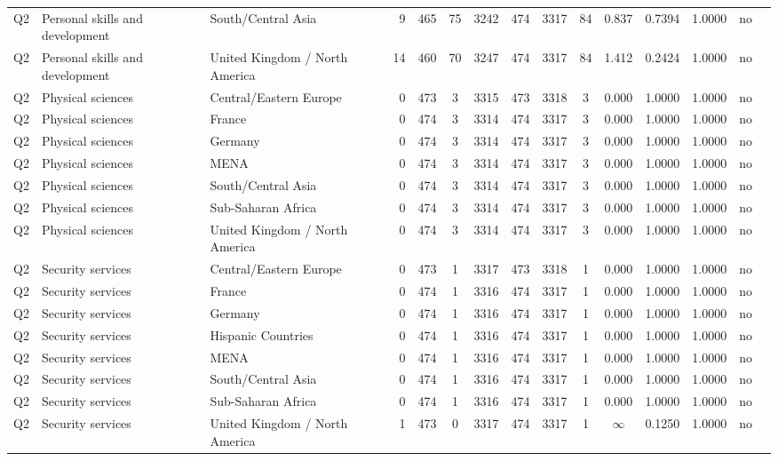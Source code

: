 \begin{longtable}{lllrcccccccccll}
Q2 & Personal skills and development & South/Central Asia & 9 & 465 & 75 & 3242 & 474 & 3317 & 84 & 0.837 & 0.7394 & 1.0000 & no \\
Q2 & Personal skills and development & United Kingdom / North America & 14 & 460 & 70 & 3247 & 474 & 3317 & 84 & 1.412 & 0.2424 & 1.0000 & no \\
Q2 & Physical sciences & Central/Eastern Europe & 0 & 473 & 3 & 3315 & 473 & 3318 & 3 & 0.000 & 1.0000 & 1.0000 & no \\
Q2 & Physical sciences & France & 0 & 474 & 3 & 3314 & 474 & 3317 & 3 & 0.000 & 1.0000 & 1.0000 & no \\
Q2 & Physical sciences & Germany & 0 & 474 & 3 & 3314 & 474 & 3317 & 3 & 0.000 & 1.0000 & 1.0000 & no \\
Q2 & Physical sciences & MENA & 0 & 474 & 3 & 3314 & 474 & 3317 & 3 & 0.000 & 1.0000 & 1.0000 & no \\
Q2 & Physical sciences & South/Central Asia & 0 & 474 & 3 & 3314 & 474 & 3317 & 3 & 0.000 & 1.0000 & 1.0000 & no \\
Q2 & Physical sciences & Sub-Saharan Africa & 0 & 474 & 3 & 3314 & 474 & 3317 & 3 & 0.000 & 1.0000 & 1.0000 & no \\
Q2 & Physical sciences & United Kingdom / North America & 0 & 474 & 3 & 3314 & 474 & 3317 & 3 & 0.000 & 1.0000 & 1.0000 & no \\
Q2 & Security services & Central/Eastern Europe & 0 & 473 & 1 & 3317 & 473 & 3318 & 1 & 0.000 & 1.0000 & 1.0000 & no \\
Q2 & Security services & France & 0 & 474 & 1 & 3316 & 474 & 3317 & 1 & 0.000 & 1.0000 & 1.0000 & no \\
Q2 & Security services & Germany & 0 & 474 & 1 & 3316 & 474 & 3317 & 1 & 0.000 & 1.0000 & 1.0000 & no \\
Q2 & Security services & Hispanic Countries & 0 & 474 & 1 & 3316 & 474 & 3317 & 1 & 0.000 & 1.0000 & 1.0000 & no \\
Q2 & Security services & MENA & 0 & 474 & 1 & 3316 & 474 & 3317 & 1 & 0.000 & 1.0000 & 1.0000 & no \\
Q2 & Security services & South/Central Asia & 0 & 474 & 1 & 3316 & 474 & 3317 & 1 & 0.000 & 1.0000 & 1.0000 & no \\
Q2 & Security services & Sub-Saharan Africa & 0 & 474 & 1 & 3316 & 474 & 3317 & 1 & 0.000 & 1.0000 & 1.0000 & no \\
Q2 & Security services & United Kingdom / North America & 1 & 473 & 0 & 3317 & 474 & 3317 & 1 & $\infty$ & 0.1250 & 1.0000 & no \\

\end{longtable}
